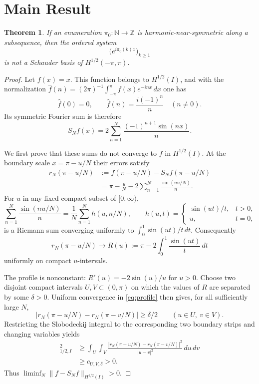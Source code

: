 \documentclass[11pt]{article}
\newtheorem{theorem}{Theorem}
\newcommand{\Z}{\mathbb Z}
\begin{document}
\section*{Main Result}

\begin{theorem}\label{thm:main}
If an enumeration $\pi_0:\mathbb N\to\Z$ is harmonic-near-symmetric along a
subsequence, then the ordered system
\[
  \bigl(e^{i\pi_0(k)x}\bigr)_{k\geq1}
\]
is not a Schauder basis of $H^{1/2}(-\pi,\pi)$.
\end{theorem}

\begin{proof}
Let $f(x)=x$.  This function belongs to $H^{1/2}(I)$, and with the
normalization
\(
 \widehat f(n)=(2\pi)^{-1}\int_{-\pi}^{\pi}f(x)e^{-inx}\,dx
\)
one has
\[
 \widehat f(0)=0,
 \qquad
 \widehat f(n)=\frac{i(-1)^n}{n}\quad(n\ne0).
\]
Its symmetric Fourier sum is therefore
\[
 S_Nf(x)=2\sum_{n=1}^N\frac{(-1)^{n+1}\sin(nx)}n.
\]

We first prove that these sums do not converge to $f$ in $H^{1/2}(I)$.
At the boundary scale $x=\pi-u/N$ their errors satisfy
\begin{align*}
 r_N(\pi-u/N)
 &:=f(\pi-u/N)-S_Nf(\pi-u/N)\\
 &=\pi-\frac uN-2\sum_{n=1}^N\frac{\sin(nu/N)}n.
\end{align*}
For $u$ in any fixed compact subset of $[0,\infty)$,
\[
 \sum_{n=1}^N\frac{\sin(nu/N)}n
 =\frac1N\sum_{n=1}^N h(u,n/N),
 \qquad
 h(u,t)=
 \begin{cases}\sin(ut)/t,&t>0,\\u,&t=0,
 \end{cases}
\]
is a Riemann sum converging uniformly to $\int_0^1\sin(ut)/t\,dt$.
Consequently
\begin{equation}\label{eq:profile}
 r_N(\pi-u/N)\longrightarrow
 R(u):=\pi-2\int_0^1\frac{\sin(ut)}t\,dt
\end{equation}
uniformly on compact $u$-intervals.

The profile is nonconstant: $R'(u)=-2\sin(u)/u$ for $u>0$.  Choose two
disjoint compact intervals $U,V\subset(0,\pi)$ on which the values of $R$
are separated by some $\delta>0$.  Uniform convergence in
\eqref{eq:profile} then gives, for all sufficiently large $N$,
\[
 |r_N(\pi-u/N)-r_N(\pi-v/N)|\geq\delta/2
 \qquad(u\in U,\ v\in V).
\]
Restricting the Slobodeckij integral to the corresponding two boundary
strips and changing variables yields
\begin{align*}
 [r_N]_{1/2,I}^2
 &\geq
 \int_U\!\int_V
 \frac{|r_N(\pi-u/N)-r_N(\pi-v/N)|^2}{|u-v|^2}\,du\,dv\\
 &\geq c_{U,V,\delta}>0.
\end{align*}
Thus $\liminf_N\|f-S_Nf\|_{H^{1/2}(I)}>0$.


\end{proof}
\end{document}
